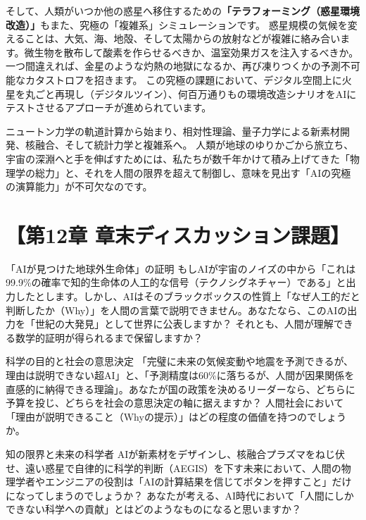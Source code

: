 そして、人類がいつか他の惑星へ移住するための\textbf{「テラフォーミング（惑星環境改造）」}もまた、究極の「複雑系」シミュレーションです。 惑星規模の気候を変えることは、大気、海、地殻、そして太陽からの放射などが複雑に絡み合います。微生物を散布して酸素を作らせるべきか、温室効果ガスを注入するべきか。一つ間違えれば、金星のような灼熱の地獄になるか、再び凍りつくかの予測不可能なカタストロフを招きます。 この究極の課題において、デジタル空間上に火星を丸ごと再現し（デジタルツイン）、何百万通りもの環境改造シナリオをAIにテストさせるアプローチが進められています。

ニュートン力学の軌道計算から始まり、相対性理論、量子力学による新素材開発、核融合、そして統計力学と複雑系へ。 人類が地球のゆりかごから旅立ち、宇宙の深淵へと手を伸ばすためには、私たちが数千年かけて積み上げてきた「物理学の総力」と、それを人間の限界を超えて制御し、意味を見出す「AIの究極の演算能力」が不可欠なのです。

\section*{【第12章 章末ディスカッション課題】}

「AIが見つけた地球外生命体」の証明 もしAIが宇宙のノイズの中から「これは99.9\%の確率で知的生命体の人工的な信号（テクノシグネチャー）である」と出力したとします。しかし、AIはそのブラックボックスの性質上「なぜ人工的だと判断したか（Why）」を人間の言葉で説明できません。あなたなら、このAIの出力を「世紀の大発見」として世界に公表しますか？ それとも、人間が理解できる数学的証明が得られるまで保留しますか？

科学の目的と社会の意思決定 「完璧に未来の気候変動や地震を予測できるが、理由は説明できない超AI」と、「予測精度は60\%に落ちるが、人間が因果関係を直感的に納得できる理論」。あなたが国の政策を決めるリーダーなら、どちらに予算を投じ、どちらを社会の意思決定の軸に据えますか？ 人間社会において「理由が説明できること（Whyの提示）」はどの程度の価値を持つのでしょうか。

知の限界と未来の科学者 AIが新素材をデザインし、核融合プラズマをねじ伏せ、遠い惑星で自律的に科学的判断（AEGIS）を下す未来において、人間の物理学者やエンジニアの役割は「AIの計算結果を信じてボタンを押すこと」だけになってしまうのでしょうか？ あなたが考える、AI時代において「人間にしかできない科学への貢献」とはどのようなものになると思いますか？




